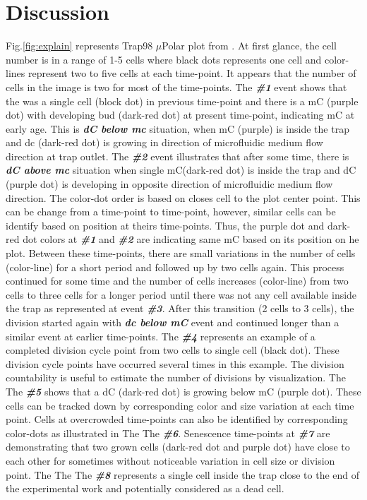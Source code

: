 \documentclass[conference]{IEEEtran}
\begin{document}
\section{Discussion}
Fig.\ref{fig:explain} represents Trap98 $\mu$Polar plot from . At first glance, the cell number is in a range of 1-5 cells where black dots represents one cell and color-lines represent two to five cells at each time-point. It appears that the number of cells in the image is two for most of the time-points. The \textbf{\textit{\#1}} event shows that the was a single cell (block dot) in previous time-point and there is a mC (purple dot) with developing bud (dark-red dot) at present time-point, indicating mC at early age. This is \textbf{\textit{dC below mc}} situation, when mC (purple) is inside the trap and dc (dark-red dot) is growing in direction of microfluidic medium flow direction at trap outlet. The \textbf{\textit{\#2}} event illustrates that after some time, there is \textbf{\textit{dC above mc}} situation when single mC(dark-red dot) is inside the trap and dC (purple dot) is developing in opposite direction of microfluidic medium flow direction. The color-dot order is based on closes cell to the plot center point. This can be change from a time-point to time-point, however, similar cells can be identify based on position at theirs time-points. Thus, the purple dot and dark-red dot colors at \textbf{\textit{\#1}} and \textbf{\textit{\#2}} are indicating same mC based on its position on he plot. Between these time-points, there are small variations in the number of cells (color-line) for a short period and followed up by two cells again. This process continued for some time and the number of cells increases (color-line) from two cells to three cells for a longer period until there was not any cell available inside the trap as represented at event \textbf{\textit{\#3}}. After this transition (2 cells to 3 cells), the division started again with \textbf{\textit{dc below mC}} event and continued longer than a similar event at earlier time-points. The \textbf{\textit{\#4}} represents an example of a completed division cycle point from two cells to single cell (black dot). These division cycle points have occurred several times in this example. The division countability  is useful to estimate the number of divisions by visualization. The The \textbf{\textit{\#5}} shows that a dC (dark-red dot) is growing below mC (purple dot). These cells can be tracked down by corresponding color and size variation at each time point.   Cells at overcrowded time-points can also be identified by corresponding color-dots as illustrated in 
The The \textbf{\textit{\#6}}. Senescence time-points at \textbf{\textit{\#7}} are demonstrating that two grown cells (dark-red dot and purple dot) have close to each other for sometimes without noticeable variation in cell size or division point. The The The \textbf{\textit{\#8}} represents a single cell inside the trap close to the end of the experimental work and potentially considered as a dead cell. 
\end{document}

